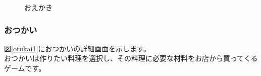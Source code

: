 \documentclass[a4j]{jarticle}
\begin{document}
\begin{figure}[H]
    \begin{center}
    \caption {おえかき}
    \label{oekaki2}
    \end{center}
\end{figure}

\subsubsection{おつかい}
図\ref{otukai1}におつかいの詳細画面を示します。\\
おつかいは作りたい料理を選択し、その料理に必要な材料をお店から買ってくるゲームです。\\
\end{document}
